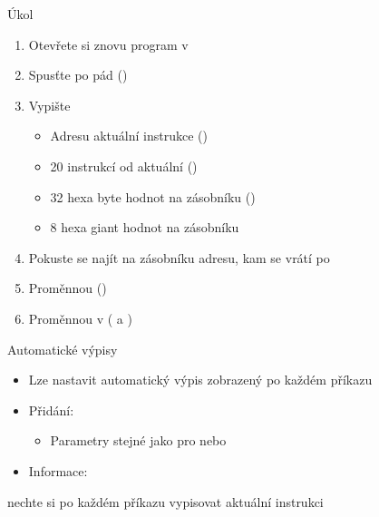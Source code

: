 \begin{frame}{Úkol}

  \begin{enumerate}
    \item Otevřete si znovu program  v 
    \item Spusťte po pád ()
    \item Vypište
    \begin{itemize}
      \item Adresu aktuální instrukce ()
      \item 20 instrukcí od aktuální ()
      \item 32 hexa byte hodnot na zásobníku ()
      \item 8 hexa giant hodnot na zásobníku
    \end{itemize}
    \item Pokuste se najít na zásobníku adresu, kam se vrátí po 
    \item Proměnnou  ()
    \item Proměnnou  v  ( a )
  \end{enumerate}

\end{frame}

\iffimuni

\else

\begin{frame}{Automatické výpisy}

  \begin{itemize}
    \item Lze nastavit automatický výpis zobrazený po každém příkazu

    \pause

    \item Přidání: 
    \begin{itemize}
      \item Parametry stejné jako pro  nebo 
    \end{itemize}
    \item Informace: 
  \end{itemize}

\pause
\bigskip

 nechte si po každém příkazu vypisovat aktuální instrukci

\end{frame}

